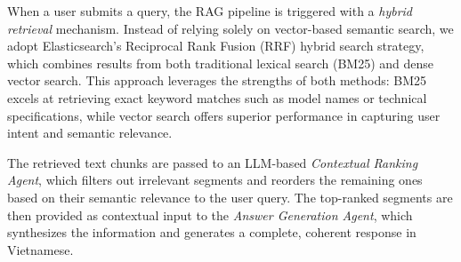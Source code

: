 
When a user submits a query, the RAG pipeline is triggered with a \textit{hybrid retrieval} mechanism. Instead of relying solely on vector-based semantic search, we adopt Elasticsearch’s Reciprocal Rank Fusion (RRF) hybrid search strategy, which combines results from both traditional lexical search (BM25) and dense vector search. This approach leverages the strengths of both methods: BM25 excels at retrieving exact keyword matches such as model names or technical specifications, while vector search offers superior performance in capturing user intent and semantic relevance.


The retrieved text chunks are passed to an LLM-based \textit{Contextual Ranking Agent}, which filters out irrelevant segments and reorders the remaining ones based on their semantic relevance to the user query. The top-ranked segments are then provided as contextual input to the \textit{Answer Generation Agent}, which synthesizes the information and generates a complete, coherent response in Vietnamese.





